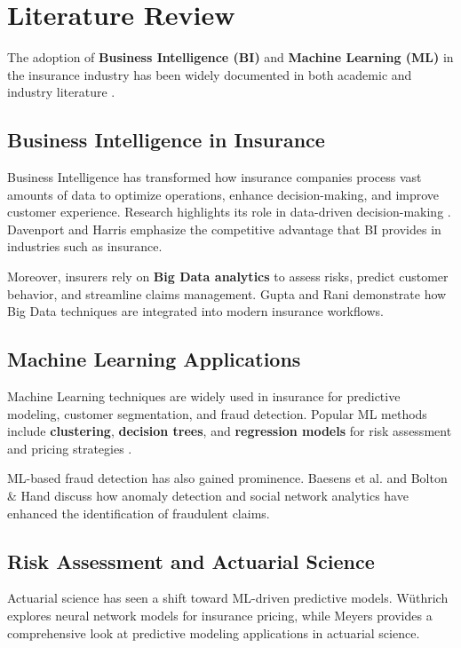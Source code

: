 \section{Literature Review}

The adoption of \textbf{Business Intelligence (BI)} and \textbf{Machine Learning (ML)} in the insurance industry has been widely documented in both academic and industry literature \cite{chen2012, davenport2007}.

\subsection{Business Intelligence in Insurance}

Business Intelligence has transformed how insurance companies process vast amounts of data to optimize operations, enhance decision-making, and improve customer experience. Research highlights its role in data-driven decision-making \cite{chen2012}. Davenport and Harris \cite{davenport2007} emphasize the competitive advantage that BI provides in industries such as insurance.

Moreover, insurers rely on \textbf{Big Data analytics} to assess risks, predict customer behavior, and streamline claims management. Gupta and Rani \cite{gupta2021} demonstrate how Big Data techniques are integrated into modern insurance workflows.

\subsection{Machine Learning Applications}

Machine Learning techniques are widely used in insurance for predictive modeling, customer segmentation, and fraud detection. Popular ML methods include \textbf{clustering}, \textbf{decision trees}, and \textbf{regression models} for risk assessment and pricing strategies \cite{makridakis2018, wuthrich2019}.

ML-based fraud detection has also gained prominence. Baesens et al. \cite{baesens2015} and Bolton \& Hand \cite{bolton2002} discuss how anomaly detection and social network analytics have enhanced the identification of fraudulent claims.

\subsection{Risk Assessment and Actuarial Science}

Actuarial science has seen a shift toward ML-driven predictive models. Wüthrich \cite{wuthrich2019} explores neural network models for insurance pricing, while Meyers \cite{meyers2015} provides a comprehensive look at predictive modeling applications in actuarial science.

